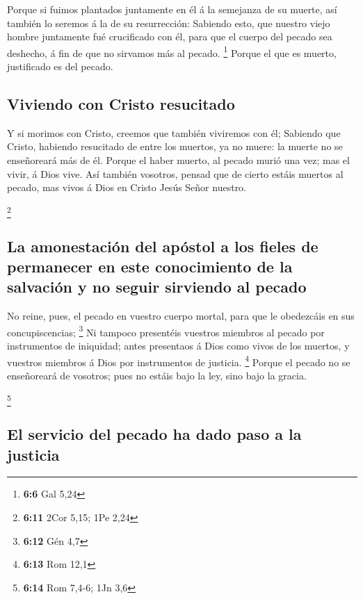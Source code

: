  Porque si fuimos plantados juntamente en él á la semejanza
de su muerte, así también lo seremos á la de su resurrección:
 Sabiendo esto, que nuestro viejo hombre juntamente fué
crucificado con él, para que el cuerpo del pecado sea deshecho, á fin de
que no sirvamos más al pecado. \footnote{\textbf{6:6} Gal 5,24}
 Porque el que es muerto, justificado es del pecado.

\hypertarget{viviendo-con-cristo-resucitado}{%
\subsection{Viviendo con Cristo
resucitado}\label{viviendo-con-cristo-resucitado}}

 Y si morimos con Cristo, creemos que también viviremos con
él;  Sabiendo que Cristo, habiendo resucitado de entre los
muertos, ya no muere: la muerte no se enseñoreará más de él.
 Porque el haber muerto, al pecado murió una vez; mas el
vivir, á Dios vive.  Así también vosotros, pensad que de
cierto estáis muertos al pecado, mas vivos á Dios en Cristo Jesús Señor
nuestro.

\footnote{\textbf{6:11} 2Cor 5,15; 1Pe 2,24}

\hypertarget{la-amonestaciuxf3n-del-apuxf3stol-a-los-fieles-de-permanecer-en-este-conocimiento-de-la-salvaciuxf3n-y-no-seguir-sirviendo-al-pecado}{%
\subsection{La amonestación del apóstol a los fieles de permanecer en
este conocimiento de la salvación y no seguir sirviendo al
pecado}\label{la-amonestaciuxf3n-del-apuxf3stol-a-los-fieles-de-permanecer-en-este-conocimiento-de-la-salvaciuxf3n-y-no-seguir-sirviendo-al-pecado}}

 No reine, pues, el pecado en vuestro cuerpo mortal, para
que le obedezcáis en sus concupiscencias; \footnote{\textbf{6:12} Gén
  4,7}  Ni tampoco presentéis vuestros miembros al pecado
por instrumentos de iniquidad; antes presentaos á Dios como vivos de los
muertos, y vuestros miembros á Dios por instrumentos de justicia.
\footnote{\textbf{6:13} Rom 12,1}  Porque el pecado no se
enseñoreará de vosotros; pues no estáis bajo la ley, sino bajo la
gracia.

\footnote{\textbf{6:14} Rom 7,4-6; 1Jn 3,6}

\hypertarget{el-servicio-del-pecado-ha-dado-paso-a-la-justicia}{%
\subsection{El servicio del pecado ha dado paso a la
justicia}\label{el-servicio-del-pecado-ha-dado-paso-a-la-justicia}}

